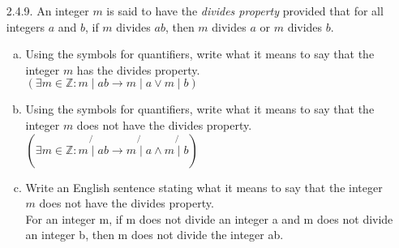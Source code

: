 \documentclass[12pt]{article}
\begin{document}
\begin{itemize}
\hrulefill

\item[2.4.9.] An integer $m$ is said to have the \emph{divides property} provided that for all integers $a$ and $b$, if $m$ divides $ab$, then $m$ divides $a$ or $m$ divides $b$.
\begin{enumerate}[(a)]
\item Using the symbols for quantifiers, write what it means to say that the integer $m$ has the divides property. \\
\indent $(\exists m \in \mathbb{Z} : m \mid ab \rightarrow m \mid a \vee m \mid b)$ \\
\item Using the symbols for quantifiers, write what it means to say that the integer $m$ does not have the divides property. \\
\indent $(\exists m \in \mathbb{Z} : m \not{\mid} ab \rightarrow m \not{\mid} a \wedge m \not{\mid} b)$ \\
\item Write an English sentence stating what it means to say that the integer $m$ does not have the divides property. \\
\indent For an integer m, if m does not divide an integer a and m does not divide an integer b, then m does 
not divide the integer ab.
\end{enumerate}

\end{itemize}
\end{document}
